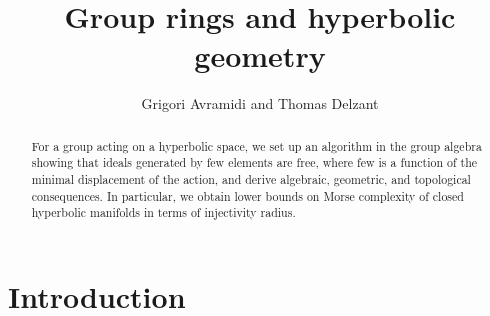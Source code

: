 \documentclass[11pt,letterpaper]{amsart}
\title{Group rings and hyperbolic geometry}
\author{Grigori Avramidi and Thomas Delzant}
\begin{document}
\maketitle



\begin{abstract}
For a group acting on a hyperbolic space, we set up an algorithm in the group algebra showing that ideals generated by few elements are free, where few is a function of the minimal displacement of the action, and derive algebraic, geometric, and topological consequences.  In particular, we obtain lower bounds on Morse complexity of closed hyperbolic manifolds in terms of injectivity radius. 
\end{abstract}
\section{Introduction}
\end{document}
